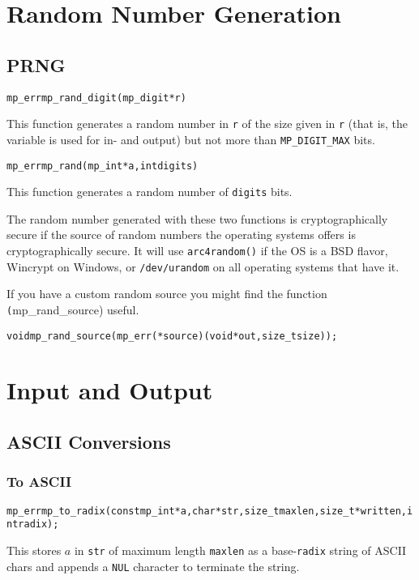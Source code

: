\documentclass[synpaper]{book}
\begin{document}
\chapter{Random Number Generation}
\section{PRNG}
\begin{alltt}
mp_err mp_rand_digit(mp_digit *r)
\end{alltt}
This function generates a random number in \texttt{r} of the size given in \texttt{r} (that is, the variable is used for in- and output) but not more than \texttt{MP\_DIGIT\_MAX} bits.

\begin{alltt}
mp_err mp_rand(mp_int *a, int digits)
\end{alltt}
This function generates a random number of \texttt{digits} bits.

The random number generated with these two functions is cryptographically secure if the source of random numbers the operating systems offers is cryptographically secure. It will use \texttt{arc4random()} if the OS is a BSD flavor, Wincrypt on Windows, or \texttt{/dev/urandom} on all operating systems that have it.

If you have a custom random source you might find the function \texttt(mp\_rand\_source) useful.
\begin{alltt}
void mp_rand_source(mp_err(*source)(void *out, size_t size));
\end{alltt}


\chapter{Input and Output}
\section{ASCII Conversions}
\subsection{To ASCII}
\begin{alltt}
mp_err mp_to_radix (const mp_int *a, char *str, size_t maxlen, size_t *written, int radix);
\end{alltt}
This stores $a$ in \texttt{str} of maximum length \texttt{maxlen} as a base-\texttt{radix} string of ASCII chars and appends a \texttt{NUL} character to terminate the string.
\end{document}
